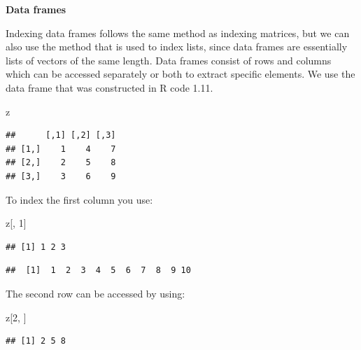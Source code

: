 \documentclass[]{book}
\newenvironment{Shaded}{\begin{snugshade}}{\end{snugshade}}
\newcommand{\DecValTok}[1]{\textcolor[rgb]{0.00,0.00,0.81}{#1}}
\newcommand{\OperatorTok}[1]{\textcolor[rgb]{0.81,0.36,0.00}{\textbf{#1}}}
\newcommand{\NormalTok}[1]{#1}
\begin{document}
\textbf{Data frames}

Indexing data frames follows the same method as indexing matrices, but
we can also use the method that is used to index lists, since data
frames are essentially lists of vectors of the same length. Data frames
consist of rows and columns which can be accessed separately or both to
extract specific elements. We use the data frame that was constructed in
R code 1.11.

\begin{Shaded}
\begin{Highlighting}[]
\NormalTok{z}
\end{Highlighting}
\end{Shaded}

\begin{verbatim}
##      [,1] [,2] [,3]
## [1,]    1    4    7
## [2,]    2    5    8
## [3,]    3    6    9
\end{verbatim}

To index the first column you use:

\begin{Shaded}
\begin{Highlighting}[]
\NormalTok{z[, }\DecValTok{1}\NormalTok{]}
\end{Highlighting}
\end{Shaded}

\begin{verbatim}
## [1] 1 2 3
\end{verbatim}

\begin{Shaded}
\end{Shaded}

\begin{verbatim}
##  [1]  1  2  3  4  5  6  7  8  9 10
\end{verbatim}

The second row can be accessed by using:

\begin{Shaded}
\begin{Highlighting}[]
\NormalTok{z[}\DecValTok{2}\NormalTok{, ]}
\end{Highlighting}
\end{Shaded}

\begin{verbatim}
## [1] 2 5 8
\end{verbatim}
\end{document}

